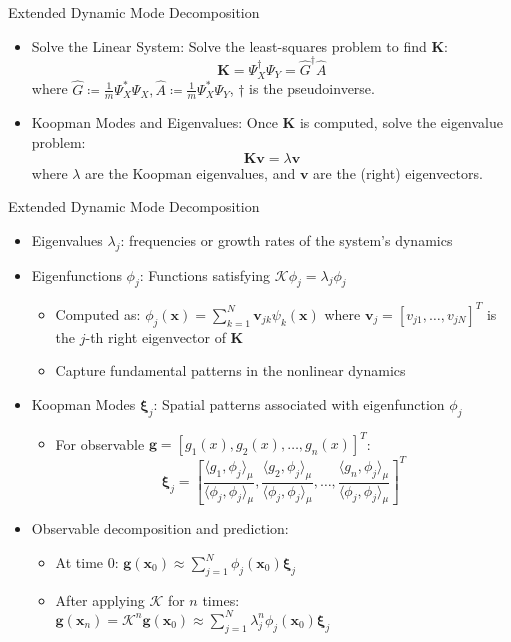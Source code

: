 \documentclass{beamer}
\begin{document}
	\begin{frame}{Extended Dynamic Mode Decomposition}
		\begin{itemize}
			\item Solve the Linear System:
			Solve the least-squares problem to find \( \mathbf{K} \):
			\[
			\mathbf{K} = \Psi_X^\dagger \Psi_Y = \widehat{G}^\dagger \widehat{A}
			\]
			where $\widehat{G}\coloneqq\frac{1}{m}\Psi_X^* \Psi_X, \widehat{A}\coloneqq\frac{1}{m}\Psi_X^* \Psi_Y$, \( \dagger \) is the pseudoinverse.
			
			\item Koopman Modes and Eigenvalues:
			Once \( \mathbf{K} \) is computed, solve the eigenvalue problem:
			\[
			\mathbf{K} \mathbf{v} = \lambda \mathbf{v}
			\]
			where \( \lambda \) are the Koopman eigenvalues, and \( \mathbf{v} \) are the (right) eigenvectors.   
		\end{itemize}
	\end{frame}
	
	\begin{frame}{Extended Dynamic Mode Decomposition}
		\begin{itemize}
			\item Eigenvalues $\lambda_j$: frequencies or growth rates of the system's dynamics
			\item Eigenfunctions $\phi_j$: Functions satisfying $\mathcal{K}\phi_j = \lambda_j \phi_j$
			\begin{itemize}
				\item Computed as: $\phi_j(\mathbf{x}) = \sum_{k=1}^N \mathbf{v}_{jk} \psi_k(\mathbf{x})$
				where $\mathbf{v}_j = [v_{j1}, \ldots, v_{jN}]^T$ is the $j$-th right eigenvector of $\mathbf{K}$
				\item Capture fundamental patterns in the nonlinear dynamics
			\end{itemize}
			\item Koopman Modes $\bm{\xi}_j$: Spatial patterns associated with eigenfunction $\phi_j$
			\begin{itemize}
				\item For observable $\mathbf{g} = [g_1(x), g_2(x), \dots, g_n(x)]^T$:
				\[
				\bm{\xi}_j = \left[ \frac{\langle g_1, \phi_j \rangle_\mu}{\langle \phi_j, \phi_j \rangle_\mu}, \frac{\langle g_2, \phi_j \rangle_\mu}{\langle \phi_j, \phi_j \rangle_\mu}, \dots, \frac{\langle g_n, \phi_j \rangle_\mu}{\langle \phi_j, \phi_j \rangle_\mu} \right]^T
				\]
			\end{itemize}
			\item Observable decomposition and prediction:
			\begin{itemize}
				\item At time 0: $\mathbf{g}(\mathbf{x}_0) \approx \sum_{j=1}^N \phi_j(\mathbf{x}_0)\bm{\xi}_j$
				\item After applying $\mathcal{K}$ for $n$ times: $\mathbf{g}(\mathbf{x}_n) = \mathcal{K}^n\mathbf{g}(\mathbf{x}_0) \approx \sum_{j=1}^N \lambda_j^n \phi_j(\mathbf{x}_0)\bm{\xi}_j $
			\end{itemize}
		\end{itemize}
	\end{frame}
	
\end{document}
